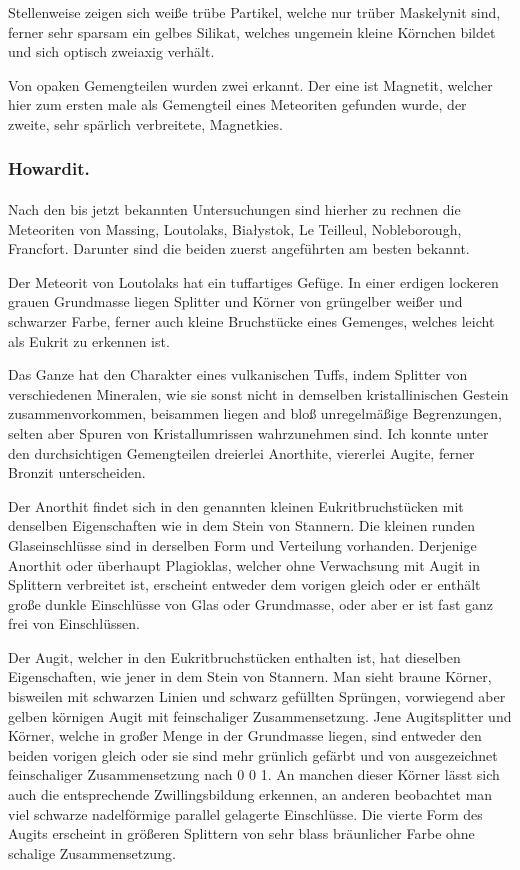 \documentclass[a4paper, 12pt, oneside]{article}
\begin{document}
Stellenweise zeigen sich weiße trübe Partikel, welche nur trüber Maskelynit sind, ferner sehr sparsam ein gelbes Silikat, welches ungemein kleine Körnchen bildet und sich optisch zweiaxig verhält.

Von opaken Gemengteilen wurden zwei erkannt. Der eine ist Magnetit, welcher hier zum ersten male als Gemengteil eines Meteoriten gefunden wurde, der zweite, sehr spärlich verbreitete, Magnetkies.

\subsubsection{Howardit.}
\paragraph{}
Nach den bis jetzt bekannten Untersuchungen sind hierher zu rechnen die Meteoriten von Massing, Loutolaks, Białystok, Le Teilleul, Nobleborough, Francfort. Darunter sind die beiden zuerst angeführten am besten bekannt.

Der Meteorit von Loutolaks hat ein tuffartiges Gefüge. In einer erdigen lockeren grauen Grundmasse liegen Splitter und Körner von grüngelber weißer und schwarzer Farbe, ferner auch kleine Bruchstücke eines Gemenges, welches leicht als Eukrit zu erkennen ist.

Das Ganze hat den Charakter eines vulkanischen Tuffs, indem Splitter von verschiedenen Mineralen, wie sie sonst nicht in demselben kristallinischen Gestein zusammenvorkommen, beisammen liegen and bloß unregelmäßige Begrenzungen, selten aber Spuren von Kristallumrissen wahrzunehmen sind. Ich konnte unter den durchsichtigen Gemengteilen dreierlei Anorthite, viererlei Augite, ferner Bronzit unterscheiden.

Der Anorthit findet sich in den genannten kleinen Eukritbruchstücken mit denselben Eigenschaften wie in dem Stein von Stannern. Die kleinen runden Glaseinschlüsse sind in derselben Form und Verteilung vorhanden. Derjenige Anorthit oder überhaupt Plagioklas, welcher ohne Verwachsung mit Augit in Splittern verbreitet ist, erscheint entweder dem vorigen gleich oder er enthält große dunkle Einschlüsse von Glas oder Grundmasse, oder aber er ist fast ganz frei von Einschlüssen.

Der Augit, welcher in den Eukritbruchstücken enthalten ist, hat dieselben Eigenschaften, wie jener in dem Stein von Stannern. Man sieht braune Körner, bisweilen mit schwarzen Linien und schwarz gefüllten Sprüngen, vorwiegend aber gelben körnigen Augit mit feinschaliger Zusammensetzung. Jene Augitsplitter und Körner, welche in großer Menge in der Grundmasse liegen, sind entweder den beiden vorigen gleich oder sie sind mehr grünlich gefärbt und von ausgezeichnet feinschaliger Zusammensetzung nach 0 0 1. An manchen dieser Körner lässt sich auch die entsprechende Zwillingsbildung erkennen, an anderen beobachtet man viel schwarze nadelförmige parallel gelagerte Einschlüsse. Die vierte Form des Augits erscheint in größeren Splittern von sehr blass bräunlicher Farbe ohne schalige Zusammensetzung.
\end{document}
